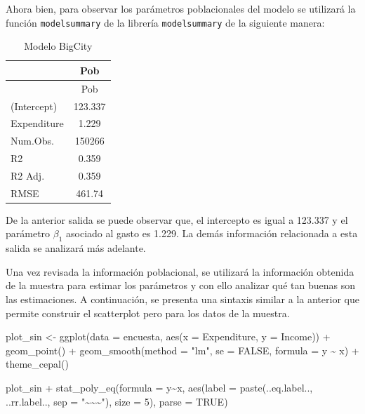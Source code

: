 \documentclass[
  12pt,
]{book}
\newenvironment{Shaded}{\begin{snugshade}}{\end{snugshade}}
\newcommand{\AttributeTok}[1]{\textcolor[rgb]{0.77,0.63,0.00}{#1}}
\newcommand{\ConstantTok}[1]{\textcolor[rgb]{0.00,0.00,0.00}{#1}}
\newcommand{\DecValTok}[1]{\textcolor[rgb]{0.00,0.00,0.81}{#1}}
\newcommand{\FunctionTok}[1]{\textcolor[rgb]{0.00,0.00,0.00}{#1}}
\newcommand{\NormalTok}[1]{#1}
\newcommand{\OtherTok}[1]{\textcolor[rgb]{0.56,0.35,0.01}{#1}}
\newcommand{\SpecialCharTok}[1]{\textcolor[rgb]{0.00,0.00,0.00}{#1}}
\newcommand{\StringTok}[1]{\textcolor[rgb]{0.31,0.60,0.02}{#1}}
\begin{document}
Ahora bien, para observar los parámetros poblacionales del modelo se utilizará la función \texttt{modelsummary} de la librería \texttt{modelsummary} de la siguiente manera:

\begin{longtable}[]{@{}lc@{}}
\caption{\label{tab:unnamed-chunk-4}Modelo BigCity}\tabularnewline
\toprule()
& Pob \\
\midrule()
\endfirsthead
\toprule()
& Pob \\
\midrule()
\endhead
(Intercept) & 123.337 \\
Expenditure & 1.229 \\
Num.Obs. & 150266 \\
R2 & 0.359 \\
R2 Adj. & 0.359 \\
RMSE & 461.74 \\
\bottomrule()
\end{longtable}

De la anterior salida se puede observar que, el intercepto es igual a 123.337 y el parámetro \(\beta_{1}\) asociado al gasto es 1.229. La demás información relacionada a esta salida se analizará más adelante.

Una vez revisada la información poblacional, se utilizará la información obtenida de la muestra para estimar los parámetros y con ello analizar qué tan buenas son las estimaciones. A continuación, se presenta una sintaxis similar a la anterior que permite construir el scatterplot pero para los datos de la muestra.

\begin{Shaded}
\begin{Highlighting}[]
\NormalTok{plot\_sin }\OtherTok{\textless{}{-}} \FunctionTok{ggplot}\NormalTok{(}\AttributeTok{data =}\NormalTok{ encuesta,}
            \FunctionTok{aes}\NormalTok{(}\AttributeTok{x =}\NormalTok{ Expenditure, }\AttributeTok{y =}\NormalTok{ Income)) }\SpecialCharTok{+}
            \FunctionTok{geom\_point}\NormalTok{() }\SpecialCharTok{+}
            \FunctionTok{geom\_smooth}\NormalTok{(}\AttributeTok{method =} \StringTok{"lm"}\NormalTok{,}
            \AttributeTok{se =} \ConstantTok{FALSE}\NormalTok{, }\AttributeTok{formula =}\NormalTok{ y }\SpecialCharTok{\textasciitilde{}}\NormalTok{ x) }\SpecialCharTok{+} \FunctionTok{theme\_cepal}\NormalTok{()}

\NormalTok{plot\_sin }\SpecialCharTok{+} \FunctionTok{stat\_poly\_eq}\NormalTok{(}\AttributeTok{formula =}\NormalTok{ y}\SpecialCharTok{\textasciitilde{}}\NormalTok{x, }\FunctionTok{aes}\NormalTok{(}\AttributeTok{label =} \FunctionTok{paste}\NormalTok{(..eq.label..,}
\NormalTok{     ..rr.label.., }\AttributeTok{sep =} \StringTok{"\textasciitilde{}\textasciitilde{}\textasciitilde{}"}\NormalTok{), }\AttributeTok{size =} \DecValTok{5}\NormalTok{), }\AttributeTok{parse =} \ConstantTok{TRUE}\NormalTok{)}
\end{Highlighting}
\end{Shaded}
\end{document}
